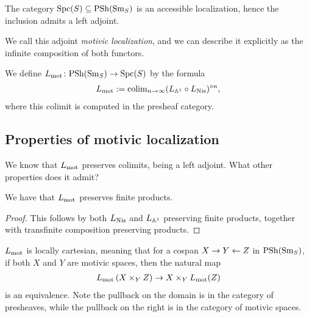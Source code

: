 \documentclass[11pt]{amsart}
\renewcommand{\Pre}{\mathrm{PSh}}
\begin{document}
\begin{proposition} The category $\mathrm{Spc}(S) \subseteq \mathrm{PSh}(\mathrm{Sm}_S)$ is an accessible localization, hence the inclusion admits a left adjoint.
\end{proposition}
We call this adjoint \textit{motivic localization}, and we can describe it explicitly as the infinite composition of both functors.

\begin{definition} We define $L_\mot \colon \Pre(\Sm_S) \to \Spc(S)$ by the formula
\begin{align*}
    L_{\mathrm{mot}} := \mathrm{colim}_{n\to \infty}(L_{\mathbb{A}^1}\circ L_{\mathrm{Nis}})^{\circ n},
\end{align*}
where this colimit is computed in the presheaf category.
\end{definition}

\subsection{Properties of motivic localization}

We know that $L_{\mathrm{mot}}$ preserves colimits, being a left adjoint. What other properties does it admit?

\begin{proposition} \cite[C.6]{Hoyois} We have that $L_{\mathrm{mot}}$ preserves finite products.
\end{proposition}
\begin{proof} This follows by both $L_{\mathrm{Nis}}$ and $L_{\mathbb{A}^1}$ preserving finite products, together with transfinite composition preserving products.
\end{proof}


\begin{proposition} \cite[3.15]{Hoyois6}
$L_{\mathrm{mot}}$ is locally cartesian, meaning that for a cospan $X \to Y \leftarrow Z$ in $\mathrm{PSh}(\mathrm{Sm}_S)$, if both $X$ and $Y$ are motivic spaces, then the natural map
\begin{align*}
    L_{\mathrm{mot}} \left( X \times_Y Z \right) \to X \times_Y L_{\mathrm{mot}}(Z)
\end{align*}
is an equivalence. Note the pullback on the domain is in the category of presheaves, while the pullback on the right is in the category of motivic spaces.
\end{proposition}
\end{document}
